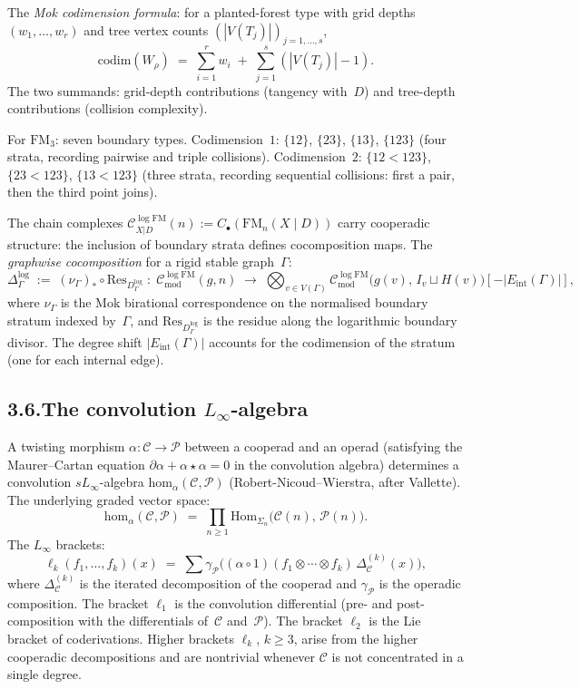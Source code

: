 \documentclass[11pt]{report}
\theoremstyle{definition}
\theoremstyle{remark}
\providecommand{\cC}{\mathcal{C}}
\providecommand{\cP}{\mathcal{P}}
\numberwithin{equation}{section}
\begin{document}
The \emph{Mok codimension formula}: for a planted-forest type with
grid depths $(w_1,\dots,w_r)$ and tree vertex counts
$(|V(T_j)|)_{j=1,\dots,s}$,
\[
\mathrm{codim}(W_\rho)
\;=\;
\textstyle\sum_{i=1}^r w_i\;+\;\sum_{j=1}^s(|V(T_j)|-1).
\]
The two summands: grid-depth contributions (tangency with~$D$)
and tree-depth contributions (collision complexity).

For $\mathrm{FM}_3$: seven boundary types. Codimension~$1$:
$\{12\}$, $\{23\}$, $\{13\}$, $\{123\}$ (four strata, recording
pairwise and triple collisions). Codimension~$2$:
$\{12{<}123\}$, $\{23{<}123\}$, $\{13{<}123\}$ (three strata,
recording sequential collisions: first a pair, then the third
point joins).

The chain complexes
$\cC^{\log\mathrm{FM}}_{X|D}(n)
:=C_\bullet(\mathrm{FM}_n(X\mathbin{|}D))$ carry cooperadic
structure: the inclusion of boundary strata defines cocomposition
maps. The \emph{graphwise cocomposition} for a rigid stable
graph~$\Gamma$:
\[
\Delta^{\log}_\Gamma
\;:=\;
(\nu_\Gamma)_*\circ\mathrm{Res}_{D^{\log}_\Gamma}
\;\colon\;
\cC^{\log\mathrm{FM}}_{\mathrm{mod}}(g,n)
\;\longrightarrow\;
\bigotimes_{v\in V(\Gamma)}
\cC^{\log\mathrm{FM}}_{\mathrm{mod}}\bigl(g(v),\,
I_v\sqcup H(v)\bigr)[-|E_{\mathrm{int}}(\Gamma)|],
\]
where $\nu_\Gamma$ is the Mok birational correspondence on the
normalised boundary stratum indexed by~$\Gamma$, and
$\mathrm{Res}_{D^{\log}_\Gamma}$ is the residue along the
logarithmic boundary divisor. The degree shift
$|E_{\mathrm{int}}(\Gamma)|$ accounts for the codimension of the
stratum (one for each internal edge).

\subsection*{3.6.\enspace The convolution $L_\infty$-algebra}

A twisting morphism $\alpha\colon\cC\to\cP$ between a cooperad and
an operad (satisfying the Maurer--Cartan equation
$\partial\alpha+\alpha\star\alpha=0$ in the convolution algebra)
determines a convolution $sL_\infty$-algebra
$\mathrm{hom}_\alpha(\cC,\cP)$ (Robert-Nicoud--Wierstra, after
Vallette). The underlying graded vector space:
\[
\mathrm{hom}_\alpha(\cC,\cP)
\;=\;
\prod_{n\ge 1}
\mathrm{Hom}_{\Sigma_n}\bigl(\cC(n),\,\cP(n)\bigr).
\]
The $L_\infty$ brackets:
\[
\ell_k(f_1,\dots,f_k)(x)
\;=\;
\sum
\gamma_{\cP}\!\bigl(
(\alpha\circ 1)(f_1\otimes\cdots\otimes f_k)\,
\Delta^{(k)}_{\cC}(x)
\bigr),
\]
where $\Delta^{(k)}_{\cC}$ is the iterated decomposition of the
cooperad and $\gamma_{\cP}$ is the operadic composition. The
bracket $\ell_1$ is the convolution differential (pre- and
post-composition with the differentials of~$\cC$ and~$\cP$). The
bracket $\ell_2$ is the Lie bracket of coderivations. Higher
brackets $\ell_k$, $k\ge 3$, arise from the higher cooperadic
decompositions and are nontrivial whenever $\cC$ is not
concentrated in a single degree.
\end{document}
